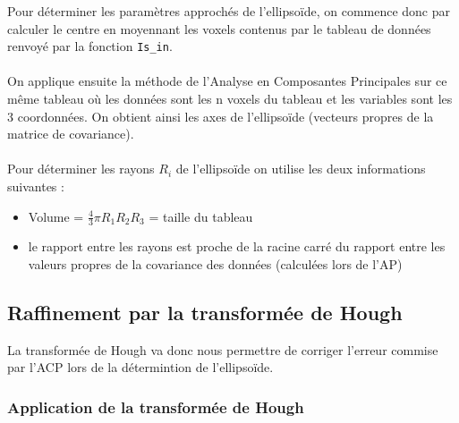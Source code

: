 \documentclass{article}
\begin{document}
Pour déterminer les paramètres approchés de l'ellipsoïde, on commence donc par calculer le centre en moyennant les voxels contenus par le tableau de données renvoyé par la fonction \texttt{Is\_in}. \\\\
On applique ensuite la méthode de l'Analyse en Composantes Principales sur ce même tableau où les données sont les n voxels du tableau et les variables sont les 3 coordonnées. On obtient ainsi les axes de l'ellipsoïde (vecteurs propres de la matrice de covariance).\\\\
Pour déterminer les rayons $R_i$ de l'ellipsoïde on utilise les deux informations suivantes :
\begin{itemize}
	\item Volume = $\frac{4}{3} \pi R_1R_2R_3$ = taille du tableau
	\item le rapport entre les rayons est proche de la racine carré du rapport entre les valeurs propres de la covariance des données (calculées lors de l'AP)
\end{itemize}

\subsection{Raffinement par la transformée de Hough}

La transformée de Hough \cite{bib:Hough, bib:genHough} va donc nous permettre de corriger l'erreur commise par l'ACP lors de la détermintion de l'ellipsoïde.

\subsubsection{Application de la transformée de Hough}
\end{document}
